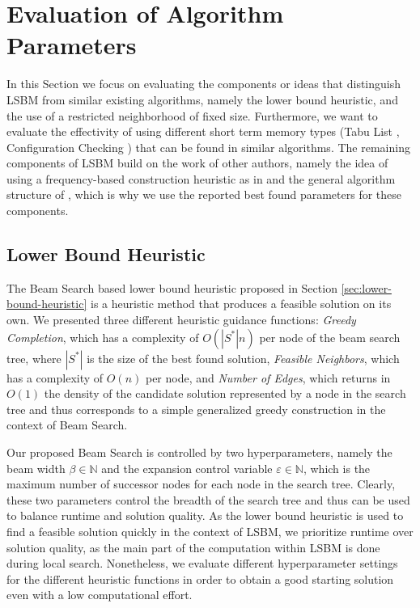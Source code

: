 \documentclass[draft,final]{vutinfth} %
\begin{document}
\section{Evaluation of Algorithm Parameters}\label{sec:alg-params}
In this Section we focus on evaluating the components or ideas that distinguish LSBM from similar existing algorithms, namely the lower bound heuristic, and the use of a restricted neighborhood of fixed size. Furthermore, we want to evaluate the effectivity of using different short term memory types (Tabu List \cite{djeddi_extension_2019}\cite{zhou_opposition-based_2020}, Configuration Checking \cite{chen_nuqclq_2021}) that can be found in similar algorithms. The remaining components of LSBM build on the work of other authors, namely the idea of using a frequency-based construction heuristic as in \cite{chen_nuqclq_2021} and the general algorithm structure of \cite{djeddi_extension_2019}, which is why we use the reported best found parameters for these components. 

\subsection{Lower Bound Heuristic}
The Beam Search based lower bound heuristic proposed in Section \ref{sec:lower-bound-heuristic} is a heuristic method that produces a feasible solution on its own. We presented three different heuristic guidance functions: \emph{Greedy Completion}, which has a complexity of $O(|S^*|n)$ per node of the beam search tree, where $|S^*|$ is the size of the best found solution, \emph{Feasible Neighbors}, which has a complexity of $O(n)$ per node, and \emph{Number of Edges}, which returns in $O(1)$ the density of the candidate solution represented by a node in the search tree and thus corresponds to a simple generalized greedy construction in the context of Beam Search. 

Our proposed Beam Search is controlled by two hyperparameters, namely the beam width $\beta \in \mathbb{N}$ and the expansion control variable $\varepsilon \in \mathbb{N}$, which is the maximum number of successor nodes for each node in the search tree. Clearly, these two parameters control the breadth of the search tree and thus can be used to balance runtime and solution quality. 
As the lower bound heuristic is used to find a feasible solution quickly in the context of LSBM, we prioritize runtime over solution quality, as the main part of the computation within LSBM is done during local search. Nonetheless, we evaluate different hyperparameter settings for the different heuristic functions in order to obtain a good starting solution even with a low computational effort. 
\end{document}
